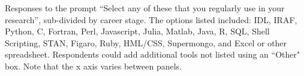 \label{fig:stack1}

Responses to the prompt ``Select any of these that you regularly use in your research'', sub-divided by career stage.  The options listed included: IDL, IRAF, Python, C, Fortran, Perl, Javascript, Julia, Matlab, Java, R, SQL, Shell Scripting, STAN, Figaro, Ruby, HML/CSS, Supermongo, and Excel or other spreadsheet.  Respondents could add additional tools not listed using an ``Other" box. Note that the x axis varies between panels.
  